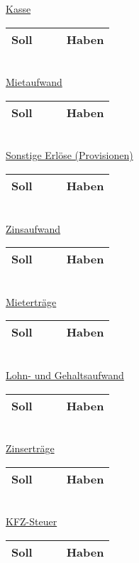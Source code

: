 \documentclass[paper=a4, fontsize=11pt]{scrartcl}
\numberwithin{equation}{section}
\numberwithin{figure}{section}
\numberwithin{table}{section}
\begin{document}
\underline{Kasse}

\begin{tabular}{cc|cc}
\hline
Soll & & & Haben \\
\hline
\end{tabular}
\\

\underline{Mietaufwand}

\begin{tabular}{cc|cc}
\hline
Soll & & & Haben \\
\hline
\end{tabular}
\\

\underline{Sonstige Erlöse (Provisionen)}

\begin{tabular}{cc|cc}
\hline
Soll & & & Haben \\
\hline
\end{tabular}
\\

\underline{Zinsaufwand}

\begin{tabular}{cc|cc}
\hline
Soll & & & Haben \\
\hline
\end{tabular}
\\

\underline{Mieterträge}

\begin{tabular}{cc|cc}
\hline
Soll & & & Haben \\
\hline
\end{tabular}
\\

\underline{Lohn- und Gehaltsaufwand}

\begin{tabular}{cc|cc}
\hline
Soll & & & Haben \\
\hline
\end{tabular}
\\

\underline{Zinserträge}

\begin{tabular}{cc|cc}
\hline
Soll & & & Haben \\
\hline
\end{tabular}
\\

\underline{KFZ-Steuer}

\begin{tabular}{cc|cc}
\hline
Soll & & & Haben \\
\hline
\end{tabular}
\\
\end{document}
